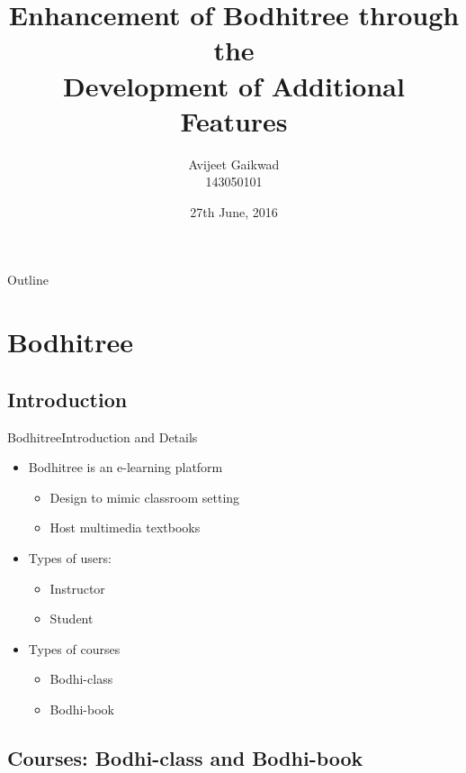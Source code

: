 \documentclass[xcolor=table]{beamer}
\title[Feature addition to Bodhitree]{Enhancement of Bodhitree through the \\ Development of Additional Features}
\author{Avijeet Gaikwad \\ 143050101}
\institute[] %
{  Guided by \\
	\vspace{0.1cm}
	{\small Prof. Kameswari Chebrolu} \\
	\vspace{0.5cm}
	Department of Computer Science and Engineering\\
	IIT Bombay
}
\date{27th June, 2016}
\begin{document}
\begin{frame}
  \titlepage
\end{frame}

\begin{frame}{Outline}
  \begin{multicols}{2}
    \tableofcontents
  \end{multicols}
\end{frame}

\section{Bodhitree}

\subsection{Introduction}

\begin{frame}{Bodhitree}{Introduction and Details}
  \begin{itemize}
  \item {
    Bodhitree is an e-learning platform
    \begin{itemize}
    	\item Design to mimic classroom setting
    	\item Host multimedia textbooks
    \end{itemize}
  }
  \item {
    Types of users:
    \begin{itemize}
    	\item Instructor
    	\item Student
    \end{itemize}
  }
  \item {
  	Types of courses
	\begin{itemize}
		\item Bodhi-class
		\item Bodhi-book
	\end{itemize}
  }
\end{itemize}
\end{frame}

\subsection{Courses: Bodhi-class and Bodhi-book}
\end{document}
